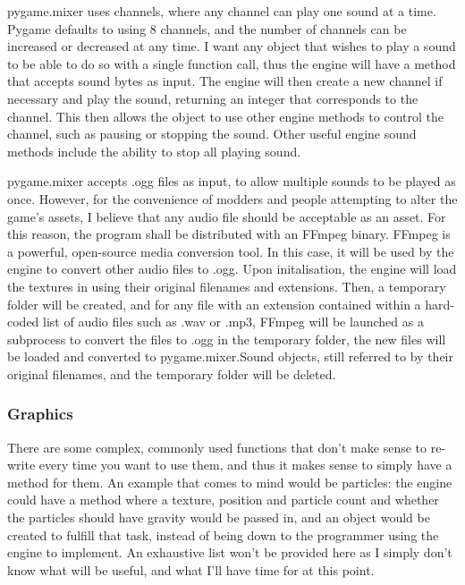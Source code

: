\documentclass{report}
\begin{document}
pygame.mixer uses channels, where any channel can play one sound at a time. Pygame defaults to using 8 channels, and the number of channels can be increased or decreased at any time. I want any object that wishes to play a sound to be able to do so with a single function call, thus the engine will have a method that accepts sound bytes as input. The engine will then create a new channel if necessary and play the sound, returning an integer that corresponds to the channel. This then allows the object to use other engine methods to control the channel, such as pausing or stopping the sound. Other useful engine sound methods include the ability to stop all playing sound.

pygame.mixer accepts .ogg files as input, to allow multiple sounds to be played as once. However, for the convenience of modders and people attempting to alter the game's assets, I believe that any audio file should be acceptable as an asset. For this reason, the program shall be distributed with an FFmpeg binary. FFmpeg is a powerful, open-source media conversion tool. In this case, it will be used by the engine to convert other audio files to .ogg. Upon initalisation, the engine will load the textures in using their original filenames and extensions. Then, a temporary folder will be created, and for any file with an extension contained within a hard-coded list of audio files such as .wav or .mp3, FFmpeg will be launched as a subprocess to convert the files to .ogg in the temporary folder, the new files will be loaded and converted to pygame.mixer.Sound objects, still referred to by their original filenames, and the temporary folder will be deleted.

\subsubsection{Graphics}

There are some complex, commonly used functions that don't make sense to re-write every time you want to use them, and thus it makes sense to simply have a method for them. An example that comes to mind would be particles: the engine could have a method where a texture, position and particle count and whether the particles should have gravity would be passed in, and an object would be created to fulfill that task, instead of being down to the programmer using the engine to implement. An exhaustive list won't be provided here as I simply don't know what will be useful, and what I'll have time for at this point.
\end{document}
